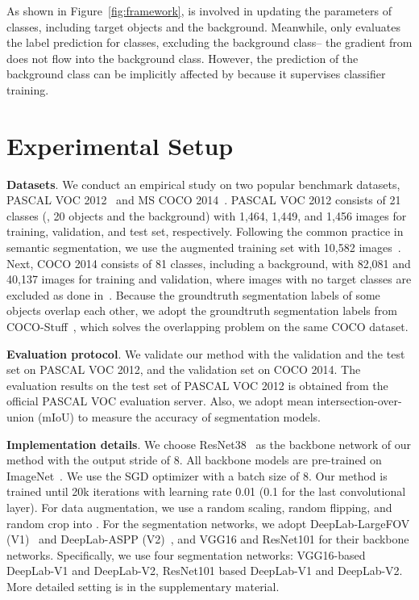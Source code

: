 \documentclass[final]{cvpr}
\begin{document}
As shown in Figure~\ref{fig:framework},  is involved in updating the parameters of  classes, including target objects and the background. Meanwhile,  only evaluates the label prediction for  classes, excluding the background class-- the gradient from  does not flow into the background class. However, the prediction of the background class can be implicitly affected by  because it supervises classifier training.


\section{Experimental Setup}
\noindent
\textbf{Datasets}. We conduct an empirical study on two popular benchmark datasets, PASCAL VOC 2012~\cite{everingham2015pascal} and MS COCO 2014~\cite{lin2014microsoft}. PASCAL VOC 2012 consists of 21 classes (\ie, 20 objects and the background) with 1,464, 1,449, and 1,456 images for training, validation, and test set, respectively. Following the common practice in semantic segmentation, we use the augmented training set with 10,582 images~\cite{hariharan2011semantic}. Next, COCO 2014 consists of 81 classes, including a background, with 82,081 and 40,137 images for training and validation, where images with no target classes are excluded as done in~\cite{choe2020attention}. Because the groundtruth segmentation labels of some objects overlap each other, we adopt the groundtruth segmentation labels from COCO-Stuff~\cite{caesar2018coco}, which solves the overlapping problem on the same COCO dataset.

\vspace{0.5mm}
\noindent
\textbf{Evaluation protocol}. We validate our method with the validation and the test set on PASCAL VOC 2012, and the validation set on COCO 2014. The evaluation results on the test set of PASCAL VOC 2012 is obtained from the official PASCAL VOC evaluation server. Also, we adopt mean intersection-over-union (mIoU) to measure the accuracy of segmentation models.

\vspace{0.5mm}
\noindent
\textbf{Implementation details}. We choose ResNet38~\cite{wu2019wider} as the backbone network of our method with the output stride of 8. All backbone models are pre-trained on ImageNet~\cite{deng2009imagenet}. We use the SGD optimizer with a batch size of 8. Our method is trained until 20k iterations with learning rate 0.01 (0.1 for the last convolutional layer). For data augmentation, we use a random scaling, random flipping, and random crop into . For the segmentation networks, we adopt DeepLab-LargeFOV (V1)~\cite{chen2014semantic} and DeepLab-ASPP (V2)~\cite{chen2017deeplab}, and VGG16 and ResNet101 for their backbone networks. Specifically, we use four segmentation networks: VGG16-based DeepLab-V1 and DeepLab-V2, ResNet101 based DeepLab-V1 and DeepLab-V2. More detailed setting is in the supplementary material. 
\end{document}
